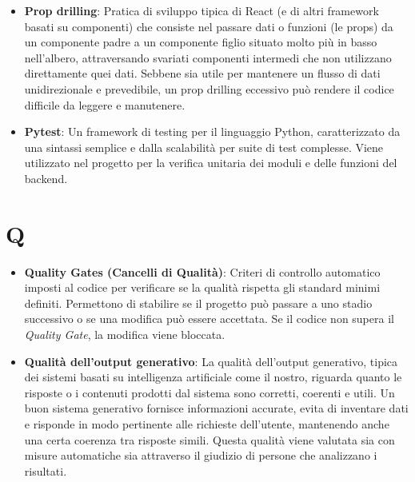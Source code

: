 \documentclass[11pt,a4paper]{article}
\begin{document}
\begin{itemize}
\item \textbf{Prop drilling}: Pratica di sviluppo tipica di React (e di altri framework basati su componenti) che consiste nel passare dati o funzioni (le props) da un componente padre a un componente figlio situato molto più in basso nell'albero, attraversando svariati componenti intermedi che non utilizzano direttamente quei dati. Sebbene sia utile per mantenere un flusso di dati unidirezionale e prevedibile, un prop drilling eccessivo può rendere il codice difficile da leggere e manutenere.

\item \textbf{Pytest}: Un framework di testing per il linguaggio Python, caratterizzato da una sintassi semplice e dalla scalabilità per suite di test complesse. Viene utilizzato nel progetto per la verifica unitaria dei moduli e delle funzioni del backend.

\end{itemize}
\newpage

\section*{Q}
\begin{itemize}
\item \textbf{Quality Gates (Cancelli di Qualità)}: Criteri di controllo automatico imposti al codice per verificare se la qualità rispetta gli standard minimi definiti. Permettono di stabilire se il progetto può passare a uno stadio successivo o se una modifica può essere accettata. Se il codice non supera il \textit{Quality Gate}, la modifica viene bloccata.

\item \textbf{Qualità dell'output generativo}: La qualità dell’output generativo, tipica dei sistemi basati su intelligenza artificiale come il nostro, riguarda quanto le risposte o i contenuti prodotti dal sistema sono corretti, coerenti e utili. Un buon sistema generativo fornisce informazioni accurate, evita di inventare dati e risponde in modo pertinente alle richieste dell’utente, mantenendo anche una certa coerenza tra risposte simili. Questa qualità viene valutata sia con misure automatiche sia attraverso il giudizio di persone che analizzano i risultati.

\end{itemize}

\newpage
\end{document}
